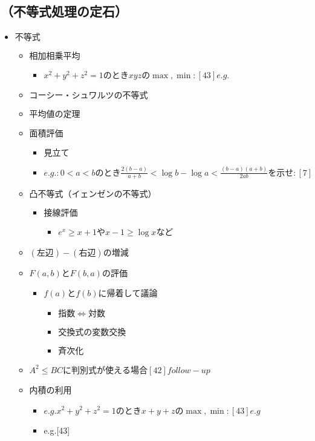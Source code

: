 \documentclass[dvipdfmx,uplatex]{jsarticle}
\begin{document}
\subsection{（不等式処理の定石）}
\begin{itemize}
	\item $ 不等式$
	\begin{itemize}
		\item $ 相加相乗平均$
		\begin{itemize}
			\item $x^2+y^2+z^2=1のときxyzの \max , \min :[43]e.g.$
		\end{itemize}
		\item $ コーシー・シュワルツの不等式$
		\item $ 平均値の定理$
		\item $ 面積評価$
		\begin{itemize}
			\item $ 見立て$
			\item $e.g.:0<a<bのとき\frac{2(b-a)}{a+b}< \log b - \log a < \frac{(b-a)(a+b)}{2ab}を示せ:[7]$
		\end{itemize}
		\item $ 凸不等式（イェンゼンの不等式）$
		\begin{itemize}
			\item $ 接線評価$
			\begin{itemize}
				\item $e^x \geq x+1$や$x-1 \geq \log x$など
			\end{itemize}
		\end{itemize}
		\item $ (左辺) - (右辺) の増減$
		\item $ F(a,b) と F(b,a)の評価$
		\begin{itemize}
			\item $ f(a) と f(b)に帰着して議論$
			\begin{itemize}
				\item $ 指数⇔対数$
				\item $ 交換式の変数交換$
				\item $ 斉次化$
			\end{itemize}
		\end{itemize}
		\item $A^2 \leq BCに判別式が使える場合[42]follow-up$
		\item 内積の利用
		\begin{itemize}
			\item $e.g. x^2+y^2+z^2=1のときx+y+zの \max , \min :[43]e.g$
			\item e.g.[43]

\end{itemize}
\end{itemize}
\end{itemize}
\end{document}
